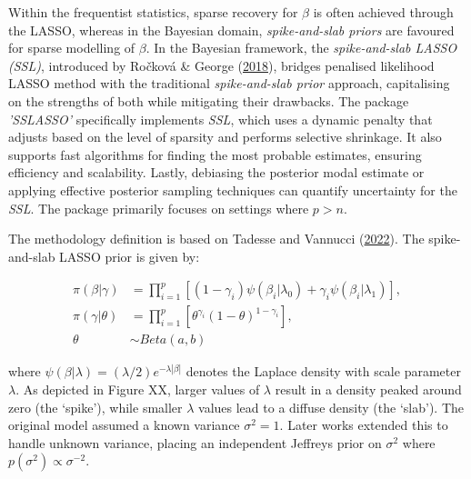 \documentclass[
  11pt,
]{article}
\begin{document}
Within the frequentist statistics, sparse recovery for \(\beta\) is
often achieved through the LASSO, whereas in the Bayesian domain,
\emph{spike-and-slab priors} are favoured for sparse modelling of
\(\beta\). In the Bayesian framework, the \emph{spike-and-slab LASSO
(SSL)}, introduced by Ročková \& George
(\protect\hyperlink{ref-Rockova2018}{2018}), bridges penalised
likelihood LASSO method with the traditional \emph{spike-and-slab prior}
approach, capitalising on the strengths of both while mitigating their
drawbacks. The package \emph{'SSLASSO'} specifically implements
\emph{SSL}, which uses a dynamic penalty that adjusts based on the level
of sparsity and performs selective shrinkage. It also supports fast
algorithms for finding the most probable estimates, ensuring efficiency
and scalability. Lastly, debiasing the posterior modal estimate or
applying effective posterior sampling techniques can quantify
uncertainty for the \emph{SSL}. The package primarily focuses on
settings where \(p > n\).

The methodology definition is based on Tadesse and Vannucci
(\protect\hyperlink{ref-Tadesse2022}{2022}). The spike-and-slab LASSO
prior is given by:

\begin{align*}
\pi(\beta|\gamma) &= \prod_{i=1}^{p} [(1 - \gamma_i) \psi (\beta_i | \lambda_0) + \gamma_i \psi (\beta_i|\lambda_1)], \\
\pi(\gamma|\theta) &= \prod_{i=1}^{p} [\theta^{\gamma_i} (1-\theta)^{1-\gamma_i}], \\
\theta &\sim Beta(a, b)
\end{align*}

where \(\psi(\beta | \lambda) = (\lambda/2)e^{-\lambda|\beta|}\) denotes
the Laplace density with scale parameter \(\lambda\). As depicted in
Figure XX, larger values of \(\lambda\) result in a density peaked
around zero (the `spike'), while smaller \(\lambda\) values lead to a
diffuse density (the `slab'). The original model assumed a known
variance \(\sigma^2 = 1\). Later works extended this to handle unknown
variance, placing an independent Jeffreys prior on \(\sigma^2\) where
\(p(\sigma^2) \propto \sigma^{-2}\).
\end{document}
